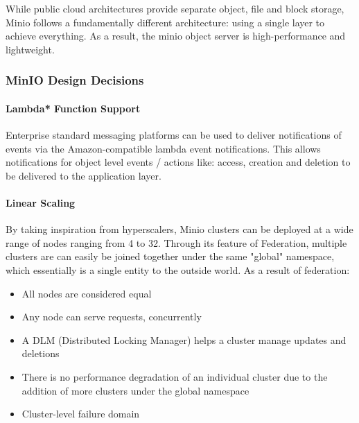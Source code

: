 \documentclass{article}
\begin{document}
While public cloud architectures provide separate object, file and block storage, Minio follows a fundamentally different architecture: using a single layer to achieve everything. As a result, the minio object server is high-performance and lightweight. 

\subsubsection{MinIO Design Decisions}

\paragraph{Lambda* Function Support}
Enterprise standard messaging platforms can be used to deliver notifications of events via the Amazon-compatible lambda event notifications. This allows notifications for object level events / actions like: access, creation and deletion to be delivered to the application layer.


\paragraph{Linear Scaling}
By taking inspiration from hyperscalers, Minio clusters can be deployed at a wide range of nodes ranging from 4 to 32. Through its feature of Federation, multiple clusters are can easily be joined together under the same "global" namespace, which essentially is a single entity to the outside world. As a result of federation:
    \begin{itemize}
        \item All nodes are considered equal
        \item Any node can serve requests, concurrently
        \item A DLM (Distributed Locking Manager) helps a cluster manage updates and deletions
        \item There is no performance degradation of an individual cluster due to the addition of more clusters under the global namespace
        \item Cluster-level failure domain
    \end{itemize}
\end{document}
